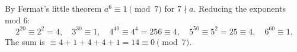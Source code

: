 By Fermat's little theorem $a^6\equiv1\pmod7$ for $7\nmid a$. Reducing the exponents mod $6$:
\[2^{20}\equiv2^2=4,\quad3^{30}\equiv1,\quad4^{40}\equiv4^4=256\equiv4,\quad5^{50}\equiv5^2=25\equiv4,\quad6^{60}\equiv1.\]
The sum is $\equiv4+1+4+4+1=14\equiv\boxed{0}\pmod7$.
